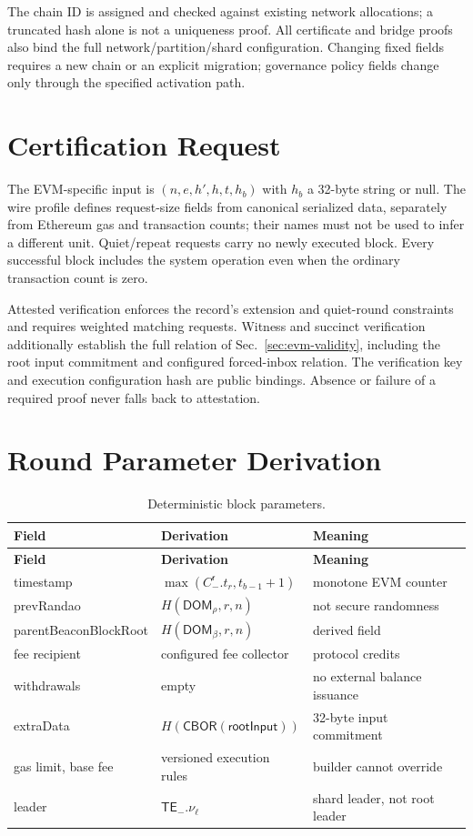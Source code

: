 The chain ID is assigned and checked against existing network allocations; a truncated hash alone is not a uniqueness proof. All certificate and bridge proofs also bind the full network/partition/shard configuration. Changing fixed fields requires a new chain or an explicit migration; governance policy fields change only through the specified activation path.

\section{Certification Request}\label{app:evm-cr}

The EVM-specific input is $(n,e,h',h,t,h_b)$ with $h_b$ a 32-byte string or null. The wire profile defines request-size fields from canonical serialized data, separately from Ethereum gas and transaction counts; their names must not be used to infer a different unit. Quiet/repeat requests carry no newly executed block. Every successful block includes the system operation even when the ordinary transaction count is zero.

Attested verification enforces the record's extension and quiet-round constraints and requires weighted matching requests. Witness and succinct verification additionally establish the full relation of Sec.~\ref{sec:evm-validity}, including the root input commitment and configured forced-inbox relation. The verification key and execution configuration hash are public bindings. Absence or failure of a required proof never falls back to attestation.

\section{Round Parameter Derivation}\label{app:evm-round-params}

\begin{longtable}{p{3.0cm}p{6.4cm}p{3.8cm}}
\caption{Deterministic block parameters.}\label{ta:evm-round-params}\\
\textbf{Field} & \textbf{Derivation} & \textbf{Meaning}\\ \hline
\endfirsthead
\textbf{Field} & \textbf{Derivation} & \textbf{Meaning}\\ \hline
\endhead
timestamp & $\max(C^\mathsf{r}_-.t_r,t_{b-1}+1)$ & monotone EVM counter\\
prevRandao & $H(\mathsf{DOM}_\rho,r,n)$ & not secure randomness\\
parentBeacon\-BlockRoot & $H(\mathsf{DOM}_\beta,r,n)$ & derived field\\
fee recipient & configured fee collector & protocol credits\\
withdrawals & empty & no external balance issuance\\
extraData & $H(\mathsf{CBOR}(\mathsf{rootInput}))$ & 32-byte input commitment\\
gas limit, base fee & versioned execution rules & builder cannot override\\
leader & $\mathsf{TE}_-.\nu_\ell$ & shard leader, not root leader\\
\end{longtable}

